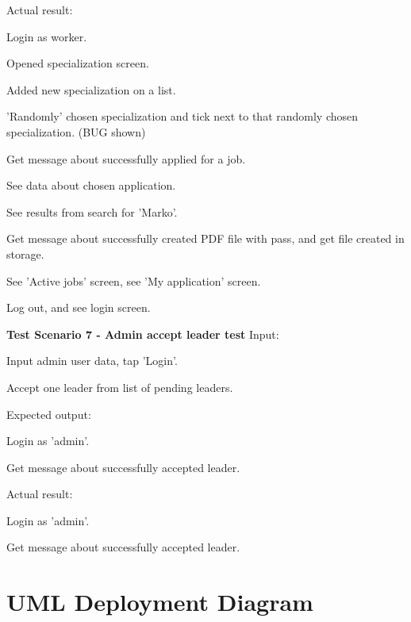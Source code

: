 			Actual result:
			\begin{packed_enum}
				\item Login as worker.
				\item Opened specialization screen.
				\item Added new specialization on a list.
				\item 'Randomly' chosen specialization and tick next to that randomly chosen specialization. (BUG shown)
				\item Get message about successfully applied for a job.
				\item See data about chosen application.
				\item See results from search for 'Marko'.
				\item Get message about successfully created PDF file with pass, and get file created in storage.
				\item See 'Active jobs' screen, see 'My application' screen.
				\item Log out, and see login screen.
			\end{packed_enum}
		
			\textbf{Test Scenario 7 - Admin accept leader test}
			Input:
			\begin{packed_enum}
				\item Input admin user data, tap 'Login'.
				\item Accept one leader from list of pending leaders.
			\end{packed_enum}
			
			Expected output:
			\begin{packed_enum}
				\item Login as 'admin'.
				\item Get message about successfully accepted leader.
			\end{packed_enum}
			
			Actual result:
			\begin{packed_enum}
				\item Login as 'admin'.
				\item Get message about successfully accepted leader.
			\end{packed_enum}
		
			\eject
		\section{UML Deployment Diagram}
		
